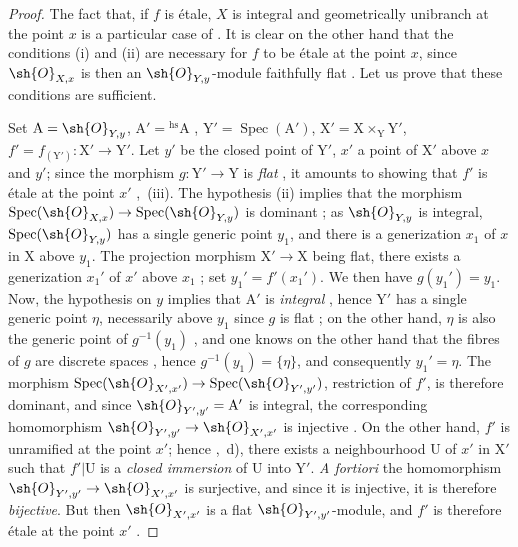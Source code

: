 \begin{proof}
The fact that, if $f$ is \'etale, $X$ is integral and geometrically unibranch at the point $x$ is a particular case of .
It is clear on the other hand that the conditions (i) and (ii) are necessary for $f$ to be \'etale at the point $x$, since $\sh{O}_{X,x}$ is then an $\sh{O}_{Y,y}$-module faithfully flat .
Let us prove that these conditions are sufficient.

Set $\mathrm{A}=\sh{O}_{Y,y}$, $\mathrm{A}'={}^{\mathrm{hs}}\mathrm{A}$ , $\mathrm{Y}'=\operatorname{Spec}(\mathrm{A}')$, $\mathrm{X}'=\mathrm{X}\times_{\mathrm{Y}}\mathrm{Y}'$, $f'=f_{(\mathrm{Y}')}:\mathrm{X}'\to\mathrm{Y}'$.
Let $y'$ be the closed point of $\mathrm{Y}'$, $x'$ a point of $\mathrm{X}'$ above $x$ and $y'$; since the morphism $g:\mathrm{Y}'\to\mathrm{Y}$ is \emph{flat} , it amounts to showing that $f'$ is \'etale at the point $x'$ ,~(iii).
The hypothesis (ii) implies that the morphism $\operatorname{Spec}(\sh{O}_{X,x})\to\operatorname{Spec}(\sh{O}_{Y,y})$ is dominant ; as $\sh{O}_{Y,y}$ is integral, $\operatorname{Spec}(\sh{O}_{Y,y})$ has a single generic point $y_1$, and there is a generization $x_1$ of $x$ in $\mathrm{X}$ above $y_1$.
The projection morphism $\mathrm{X}'\to\mathrm{X}$ being flat, there exists a generization $x_1'$ of $x'$ above $x_1$ ; set $y_1'=f'(x_1')$. We then have $g(y_1')=y_1$.
Now, the hypothesis on $y$ implies that $\mathrm{A}'$ is \emph{integral} , hence $\mathrm{Y}'$ has a single generic point $\eta$, necessarily above $y_1$ since $g$
is flat ; on the other hand, $\eta$ is also the generic point of $g^{-1}(y_1)$ , and one knows on the other hand that the fibres of $g$ are discrete spaces , hence $g^{-1}(y_1)=\{\eta\}$, and consequently $y_1'=\eta$.
The morphism $\operatorname{Spec}(\sh{O}_{X',x'})\to\operatorname{Spec}(\sh{O}_{Y',y'})$, restriction of $f'$, is therefore dominant, and since $\sh{O}_{Y',y'}=\mathrm{A}'$ is integral, the corresponding homomorphism $\sh{O}_{Y',y'}\to\sh{O}_{X',x'}$ is injective .
On the other hand, $f'$ is unramified at the point $x'$; hence ,~d), there exists a neighbourhood $\mathrm{U}$ of $x'$ in $\mathrm{X}'$ such that $f'|\mathrm{U}$ is a \emph{closed immersion} of $\mathrm{U}$ into $\mathrm{Y}'$.
\emph{A fortiori} the homomorphism $\sh{O}_{Y',y'}\to\sh{O}_{X',x'}$ is surjective, and since it is injective, it is therefore \emph{bijective}.
But then $\sh{O}_{X',x'}$ is a flat $\sh{O}_{Y',y'}$-module, and $f'$ is therefore \'etale at the point $x'$ .


\end{proof}
